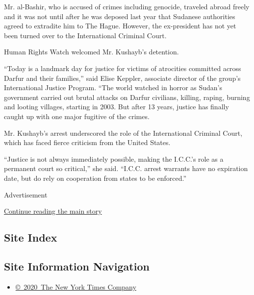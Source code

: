 Mr. al-Bashir, who is accused of crimes including genocide, traveled
abroad freely and it was not until after he was deposed last year that
Sudanese authorities agreed to extradite him to The Hague. However, the
ex-president has not yet been turned over to the International Criminal
Court.

Human Rights Watch welcomed Mr. Kushayb's detention.

``Today is a landmark day for justice for victims of atrocities
committed across Darfur and their families,'' said Elise Keppler,
associate director of the group's International Justice Program. ``The
world watched in horror as Sudan's government carried out brutal attacks
on Darfur civilians, killing, raping, burning and looting villages,
starting in 2003. But after 13 years, justice has finally caught up with
one major fugitive of the crimes.

Mr. Kushayb's arrest underscored the role of the International Criminal
Court, which has faced fierce criticism from the United States.

``Justice is not always immediately possible, making the I.C.C.'s role
as a permanent court so critical,'' she said. ``I.C.C. arrest warrants
have no expiration date, but do rely on cooperation from states to be
enforced.''

Advertisement

\protect\hyperlink{after-bottom}{Continue reading the main story}

\hypertarget{site-index}{%
\subsection{Site Index}\label{site-index}}

\hypertarget{site-information-navigation}{%
\subsection{Site Information
Navigation}\label{site-information-navigation}}

\begin{itemize}
\tightlist
\item
  \href{https://help.nytimes3xbfgragh.onion/hc/en-us/articles/115014792127-Copyright-notice}{©~2020~The
  New York Times Company}
\end{itemize}

